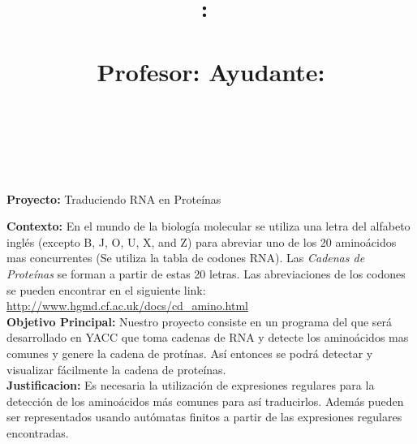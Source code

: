 \documentclass{article}
\title{
\textmd{\textbf{\tareaRamo:\ \tareaTitulo}}\\
\normalsize\vspace{0.1in}\small{\tareaFecha}\\
\vspace{0.1in}\large{Profesor: \textit{\tareaProfesor} \qquad \qquad Ayudante: \textit{\tareaAyudante}}
}
\author{
    \textbf{\tareaAlumnoUno} \\
    \small{\tareaRolUno}
    \and
    \textbf{\tareaAlumnoDos} \\
    \small{\tareaRolDos}}
\date{}
\begin{document}
\maketitle

\textbf{Proyecto:} Traduciendo RNA en Prote\'inas

\textbf{Contexto:} En el mundo de la biolog\'ia molecular se utiliza una letra del alfabeto ingl\'es (excepto B, J, O, U, X, and Z) para abreviar uno de los 20 amino\'acidos mas concurrentes (Se utiliza la tabla de codones RNA). Las \textit{Cadenas de Proteínas} se forman a partir de estas 20 letras. Las abreviaciones de los codones se pueden encontrar en el siguiente link:\\ \url{http://www.hgmd.cf.ac.uk/docs/cd_amino.html}\\

\textbf{Objetivo Principal:} Nuestro proyecto consiste en un programa del que ser\'a desarrollado en YACC que toma cadenas de RNA y detecte los amino\'acidos mas comunes y genere la cadena de prot\'inas. As\'i entonces se podr\'a detectar y visualizar f\'acilmente la cadena de prote\'inas.\\

\textbf{Justificacion:} Es necesaria la utilizaci\'on de expresiones regulares para la detecci\'on de los amino\'acidos m\'as comunes para as\'i traducirlos. Adem\'as pueden ser representados usando aut\'omatas finitos a partir de las expresiones regulares encontradas.\\
\end{document}
